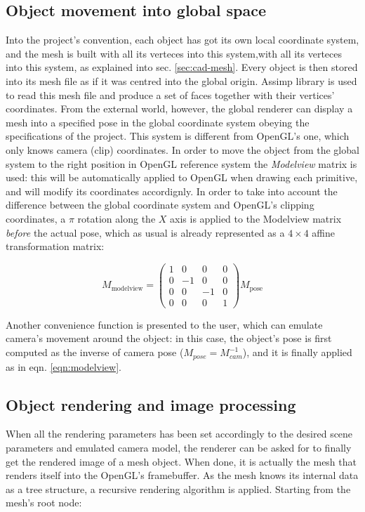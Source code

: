 \subsection{Object movement into global space}
Into the project's convention, each object has got its own local coordinate
system, and the mesh is built with all its verteces into this system,with all
its verteces into this system,  as explained into sec. \ref{sec:cad-mesh}. Every
object is then stored into its mesh file as if it was centred into the global
origin. Assimp library is used to read this mesh file and produce a set of faces
together with their vertices' coordinates. From the external world, however, the global
renderer can display a mesh into a specified pose in the global coordinate
system obeying the specifications of the project. This system is different from
OpenGL's one, which only knows camera (clip) coordinates. In order to move
the object from the global system to the right position in OpenGL reference
system the \emph{Modelview} matrix is used: this will be automatically applied
to OpenGL when drawing each primitive, and will modify its coordinates
accordignly. In order to take into account the difference between the global
coordinate system and OpenGL's clipping coordinates, a $\pi$ rotation along the
$X$ axis is applied
to the Modelview matrix \emph{before} the actual pose, which as usual is
already represented as a $4 \times 4$ affine transformation matrix:

\begin{equation} \label{eqn:modelview}
  M_{\text{modelview}} = 
  \begin{pmatrix}
    1 & 0 & 0 & 0 \\
    0 & -1 & 0 & 0 \\
    0 & 0 & -1 & 0 \\
    0 & 0 & 0 & 1 
  \end{pmatrix} M_{\text{pose}}
\end{equation}

Another convenience function is presented to the user, which can emulate
camera's movement around the object: in this case, the object's pose is first
computed as the inverse of camera pose ($M_{pose}=M_{cam}^{-1}$), and it is
finally applied as in eqn. \ref{eqn:modelview}.

\subsection{Object rendering and image processing} \label{sec:meshdraw}
When all the rendering parameters has been set accordingly to the desired scene
parameters and emulated camera model, the renderer can be asked for to finally
get the rendered image of a mesh object. When done, it is actually the mesh that
renders itself into the OpenGL's framebuffer. As the mesh knows its internal
data as a tree structure, a recursive rendering algorithm is applied. Starting
from the mesh's root node:

